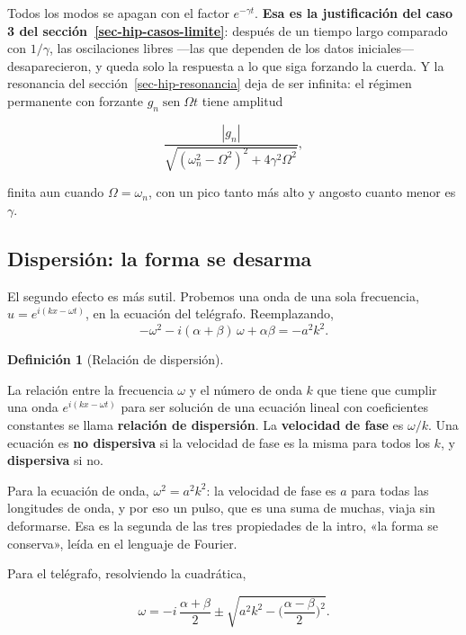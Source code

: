 \documentclass[
  spanish,
  a4paper,
]{scrbook}
\theoremstyle{definition}
\newtheorem{definition}{Definición}[chapter]
\theoremstyle{plain}
\theoremstyle{definition}
\theoremstyle{plain}
\theoremstyle{definition}
\theoremstyle{remark}
\begin{document}
Todos los modos se apagan con el factor \(e^{-\gamma t}\). \textbf{Esa
es la justificación del caso 3 del sección~\ref{sec-hip-casos-limite}}:
después de un tiempo largo comparado con \(1/\gamma\), las oscilaciones
libres ---las que dependen de los datos iniciales--- desaparecieron, y
queda solo la respuesta a lo que siga forzando la cuerda. Y la
resonancia del sección~\ref{sec-hip-resonancia} deja de ser infinita: el
régimen permanente con forzante \(g_n\operatorname{sen}\Omega t\) tiene
amplitud

\[
\frac{|g_n|}{\sqrt{(\omega_n^2-\Omega^2)^2 + 4\gamma^2\Omega^2}},
\]

finita aun cuando \(\Omega = \omega_n\), con un pico tanto más alto y
angosto cuanto menor es \(\gamma\).

\subsection{Dispersión: la forma se desarma}\label{sec-hip-dispersion}

El segundo efecto es más sutil. Probemos una onda de una sola
frecuencia, \(u = e^{i(kx-\omega t)}\), en la ecuación del telégrafo.
Reemplazando, \[
-\omega^2 - i(\alpha+\beta)\,\omega + \alpha\beta = -a^2k^2 .
\]

\begin{definition}[Relación de
dispersión]\protect\hypertarget{def-hip-dispersion}{}\label{def-hip-dispersion}

La relación entre la frecuencia \(\omega\) y el número de onda \(k\) que
tiene que cumplir una onda \(e^{i(kx-\omega t)}\) para ser solución de
una ecuación lineal con coeficientes constantes se llama
\textbf{relación de dispersión}. La \textbf{velocidad de fase} es
\(\omega/k\). Una ecuación es \textbf{no dispersiva} si la velocidad de
fase es la misma para todos los \(k\), y \textbf{dispersiva} si no.

\end{definition}

Para la ecuación de onda, \(\omega^2 = a^2k^2\): la velocidad de fase es
\(a\) para todas las longitudes de onda, y por eso un pulso, que es una
suma de muchas, viaja sin deformarse. Esa es la segunda de las tres
propiedades de la intro, «la forma se conserva», leída en el lenguaje de
Fourier.

Para el telégrafo, resolviendo la cuadrática,

\[
\omega = -i\,\frac{\alpha+\beta}{2} \pm \sqrt{a^2k^2 - \Big(\frac{\alpha-\beta}{2}\Big)^2} .
\]
\end{document}
